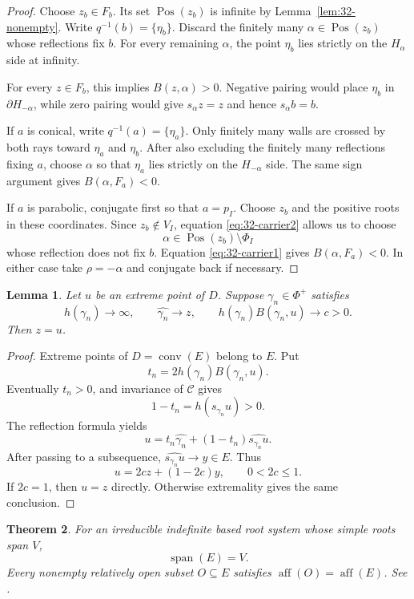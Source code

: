 \documentclass[11pt,reqno]{amsart}
\theoremstyle{plain}
\newtheorem{theorem}{Theorem}[section]
\newtheorem{lemma}[theorem]{Lemma}
\theoremstyle{definition}
\theoremstyle{remark}
\numberwithin{equation}{section}
\DeclareMathOperator{\Pos}{Pos}
\begin{document}
\begin{proof}
Choose $z_b\in F_b$.
Its set $\Pos(z_b)$ is infinite by
Lemma~\ref{lem:32-nonempty}.
Write $q^{-1}(b)=\{\eta_b\}$.
Discard the finitely many $\alpha\in\Pos(z_b)$
whose reflections fix $b$.
For every remaining $\alpha$, the point $\eta_b$
lies strictly on the $H_\alpha$ side at infinity.

For every $z\in F_b$, this implies $B(z,\alpha)>0$.
Negative pairing would place $\eta_b$ in
$\partial H_{-\alpha}$, while zero pairing would give
$s_\alpha z=z$ and hence $s_\alpha b=b$.

If $a$ is conical, write $q^{-1}(a)=\{\eta_a\}$.
Only finitely many walls are crossed by both rays
toward $\eta_a$ and $\eta_b$.
After also excluding the finitely many reflections fixing
$a$, choose $\alpha$ so that $\eta_a$ lies strictly
on the $H_{-\alpha}$ side.
The same sign argument gives $B(\alpha,F_a)<0$.

If $a$ is parabolic, conjugate first so that $a=p_I$.
Choose $z_b$ and the positive roots in these coordinates.
Since $z_b\notin V_I$, equation
\eqref{eq:32-carrier2} allows us to choose
\[
    \alpha\in\Pos(z_b)\setminus\Phi_I
\]
whose reflection does not fix $b$.
Equation \eqref{eq:32-carrier1} gives
$B(\alpha,F_a)<0$.
In either case take $\rho=-\alpha$ and conjugate back
if necessary.
\end{proof}

\begin{lemma}\label{lem:32-extreme}
Let $u$ be an extreme point of $D$.
Suppose $\gamma_n\in\Phi^+$ satisfies
\[
    h(\gamma_n)\to\infty,\qquad
    \widehat{\gamma_n}\to z,\qquad
    h(\gamma_n)B(\gamma_n,u)\to c>0.
\]
Then $z=u$.
\end{lemma}

\begin{proof}
Extreme points of $D=\operatorname{conv}(E)$ belong to $E$.
Put
\[
    t_n=2h(\gamma_n)B(\gamma_n,u).
\]
Eventually $t_n>0$, and invariance of $\mathcal C$ gives
\[
    1-t_n=h(s_{\gamma_n}u)>0.
\]
The reflection formula yields
\[
    u=t_n\widehat{\gamma_n}
      +(1-t_n)\widehat{s_{\gamma_n}u}.
\]
After passing to a subsequence,
$\widehat{s_{\gamma_n}u}\to y\in E$.
Thus
\[
    u=2cz+(1-2c)y,\qquad 0<2c\leq1.
\]
If $2c=1$, then $u=z$ directly.
Otherwise extremality gives the same conclusion.
\end{proof}

\begin{theorem}\label{thm:local-spanning}
For an irreducible indefinite based root system whose simple roots span $V$,
\[
\operatorname{span}(E)=V.
\]
Every nonempty relatively open subset $O\subseteq E$ satisfies $\operatorname{aff}(O)=\operatorname{aff}(E)$. See \cite[Proposition~2.5 and Theorem~6.12(a)]{DHR}.
\end{theorem}
\end{document}
